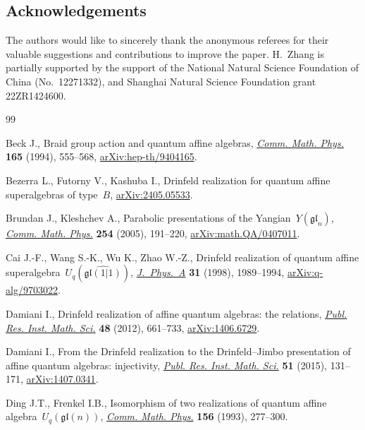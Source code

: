\documentclass[10pt,a4paper]{amsart}
\numberwithin{equation}{section}
\begin{document}
\subsection*{Acknowledgements}

The authors would like to sincerely thank the anonymous referees for their valuable suggestions and contributions to improve the paper.
H.~Zhang is partially supported by the support of the National Natural Science Foundation of China (No.~12271332), and Shanghai Natural Science Foundation grant 22ZR1424600.


\begin{thebibliography}{99}
\footnotesize\itemsep=0pt

Beck J., Braid group action and quantum affine algebras, \href{https://doi.org/10.1007/BF02099423}{\textit{Comm. Math.
 Phys.}} \textbf{165} (1994), 555--568, \href{https://arxiv.org/abs/hep-th/9404165}{arXiv:hep-th/9404165}.

Bezerra L., Futorny V., Kashuba I., Drinfeld realization for quantum affine
 superalgebras of type~{$B$}, \href{https://arxiv.org/abs/2405.05533}{arXiv:2405.05533}.

Brundan J., Kleshchev A., Parabolic presentations of the
 {Y}angian~{$Y({\mathfrak{gl}}_n)$}, \href{https://doi.org/10.1007/s00220-004-1249-6}{\textit{Comm. Math. Phys.}} \textbf{254}
 (2005), 191--220, \href{https://arxiv.org/abs/math.QA/0407011}{arXiv:math.QA/0407011}.

Cai J.-F., Wang S.-K., Wu K., Zhao W.-Z., Drinfeld realization of quantum affine
 superalgebra~{$U_q(\widehat{\mathfrak{gl}(1|1)})$}, \href{https://doi.org/10.1088/0305-4470/31/8/011}{\textit{J.~Phys.~A}}
 \textbf{31} (1998), 1989--1994, \href{https://arxiv.org/abs/q-alg/9703022}{arXiv:q-alg/9703022}.

Damiani I., Drinfeld realization of affine quantum algebras: the relations,
\href{https://doi.org/10.2977/PRIMS/86}{\textit{Publ. Res. Inst. Math. Sci.}} \textbf{48} (2012), 661--733,
 \href{https://arxiv.org/abs/1406.6729}{arXiv:1406.6729}.

Damiani I., From the {D}rinfeld realization to the {D}rinfeld--{J}imbo
 presentation of affine quantum algebras: injectivity, \href{https://doi.org/10.4171/PRIMS/150}{\textit{Publ. Res.
 Inst. Math. Sci.}} \textbf{51} (2015), 131--171, \href{https://arxiv.org/abs/1407.0341}{arXiv:1407.0341}.

Ding J.T., Frenkel I.B., Isomorphism of two realizations of quantum affine
 algebra~{$U_q(\mathfrak{gl}(n))$}, \href{https://doi.org/10.1007/bf02098484}{\textit{Comm. Math. Phys.}} \textbf{156}
 (1993), 277--300.


\end{thebibliography}
\end{document}

